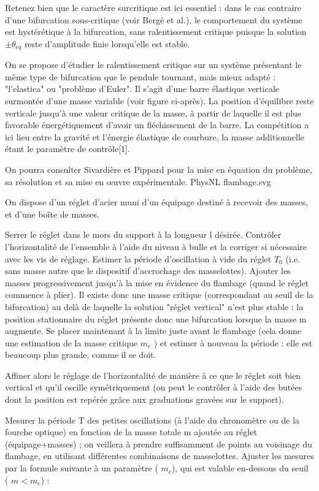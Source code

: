 \documentclass{article}%
\begin{document}
Retenez bien que le caractère surcritique est ici essentiel : dans le cas contraire d'une bifurcation sous-critique (voir Bergé et al.), le comportement du système est hystérétique à la bifurcation, sans ralentissement critique puisque la solution $\pm \theta_{eq}$ reste d'amplitude finie lorsqu'elle est stable.

On se propose d'étudier le ralentissement critique sur un système présentant le même type de bifurcation que le pendule tournant, mais mieux adapté : "l'elastica" ou "problème d'Euler". Il s'agit d'une barre élastique verticale surmontée d'une masse variable (voir figure ci-après). La position d'équilibre reste verticale jusqu'à une valeur critique de la masse, à partir de laquelle il est plus favorable énergétiquement d'avoir un fléchissement de la barre. La compétition a ici lieu entre la gravité et l'énergie élastique de courbure, la masse additionnelle étant le paramètre de contrôle[1].

On pourra consulter Sivardière et Pippard pour la mise en équation du problème, sa résolution et sa mise en œuvre expérimentale.
PhysNL flambage.svg

On dispose d'un réglet d'acier muni d'un équipage destiné à recevoir des masses, et d'une boîte de masses.

    Serrer le réglet dans le mors du support à la longueur l désirée. Contrôler l'horizontalité de l'ensemble à l'aide du niveau à bulle et la corriger si nécessaire avec les vis de réglage. Estimer la période d'oscillation à vide du réglet $T_0$ (i.e. sans masse autre que le dispositif d'accrochage des masselottes).
    Ajouter les masses progressivement jusqu'à la mise en évidence du flambage (quand le réglet commence à plier). Il existe donc une masse critique (correspondant au seuil de la bifurcation) au delà de laquelle la solution "réglet vertical" n'est plus stable : la position stationnaire du réglet présente donc une bifurcation lorsque la masse m augmente.
    Se placer maintenant à la limite juste avant le flambage (cela donne une estimation de la masse critique $m_c$ ) et estimer à nouveau la période : elle est beaucoup plus grande, comme il se doit.

Affiner alors le réglage de l'horizontalité de manière à ce que le réglet soit bien vertical et qu'il oscille symétriquement (on peut le contrôler à l'aide des butées dont la position est repérée grâce aux graduations gravées sur le support).

    Mesurer la période T des petites oscillations (à l'aide du chronomètre ou de la fourche optique) en fonction de la masse totale m ajoutée au réglet (équipage+masses) ; on veillera à prendre suffisamment de points au voisinage du flambage, en utilisant différentes combinaisons de masselottes.
    Ajuster les mesures par la formule suivante à un paramètre ( $m_c$), qui est valable en-dessous du seuil ( $m < m_c$) :
\end{document}
